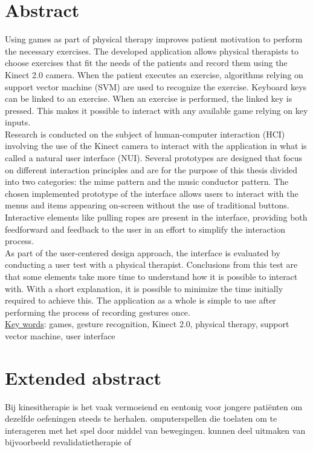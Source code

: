\chapter*{Abstract}

Using games as part of physical therapy improves patient motivation to perform the necessary exercises. The developed application allows physical therapists to choose exercises that fit the needs of the patients and record them using the Kinect 2.0 camera. When the patient executes an exercise, algorithms relying on support vector machine (SVM) are used to recognize the exercise. Keyboard keys can be linked to an exercise. When an exercise is performed, the linked key is pressed. This makes it possible to interact with any available game relying on key inputs.\\

Research is conducted on the subject of human-computer interaction (HCI) involving the use of the Kinect camera to interact with the application in what is called a natural user interface (NUI). Several prototypes are designed that focus on different interaction principles and are for the purpose of this thesis divided into two categories: the mime pattern and the music conductor pattern. The chosen implemented prototype of the interface allows users to interact with the menus and items appearing on-screen without the use of traditional buttons. Interactive elements like pulling ropes are present in the interface, providing both feedforward and feedback to the user in an effort to simplify the interaction process.\\

As part of the user-centered design approach, the interface is evaluated by conducting a user test with a physical therapist. Conclusions from this test are that some elements take more time to understand how it is possible to interact with. With a short explanation, it is possible to minimize the time initially required to achieve this. The application as a whole is simple to use after performing the process of recording gestures once.\\

\underline{Key words}: games, gesture recognition, Kinect 2.0, physical therapy, support vector machine, user interface


\chapter*{Extended abstract}

Bij kinesitherapie is het vaak vermoeiend en eentonig voor jongere pati\"enten om dezelfde oefeningen steeds te herhalen. omputerspellen die toelaten om te interageren met het spel door middel van bewegingen. kunnen deel uitmaken van bijvoorbeeld revalidatietherapie of 